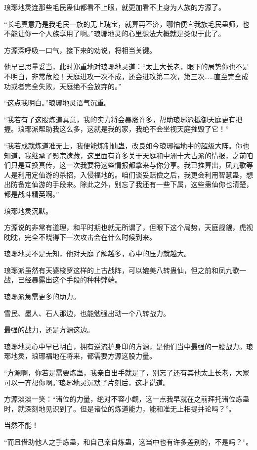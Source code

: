 \begin{this_body}
琅琊地灵连那些毛民蛊仙都看不上眼，就更加看不上身为人族的方源了。

“长毛真意乃是我毛民一族的无上瑰宝，就算再不济，哪怕便宜我族毛民蛊师，也不能让你一个人族享用了啊。”琅琊地灵的心里想法大概就是类似于此了。

方源深呼吸一口气，接下来的劝说，将相当关键。

他早已思量妥当，此时郑重地对琅琊地灵道：“太上大长老，眼下的局势你也不是不明白，非常危险！天庭进攻一次不成，还会进攻第二次，第三次……直至完全成功或者完全失败，天庭绝不会放弃的。”

“这点我明白。”琅琊地灵语气沉重。

“我若有了这股炼道真意，我的实力将会暴涨许多，帮助琅琊派抵御天庭更有把握。琅琊派帮助我这么多，这就是我的家，我绝不会坐视天庭摧毁了它！”

“我若成就炼道准无上，我便能炼制仙蛊，改良如今琅琊福地中的超级大阵。你也知道，我继承了影宗遗藏，这里面有许多关于天庭和中洲十大古派的情报，之前咱们只是互换真传，这一次我要将这些情报都拿来与你分享。我已推算出，凤九歌等人是利用定仙游的杀招，入侵福地的。咱们谈妥赔偿之后，我更会利用智慧蛊，想出防备定仙游的手段来。除此之外，别忘了我还有一些下属，这些蛊仙你也清楚，都是战斗精英啊。”

琅琊地灵沉默。

方源说的非常有道理，和平时期也就无所谓了，但眼下这个局势，天庭觊觎，虎视眈眈，完全不晓得下一次攻击会在什么时候到来。

琅琊地灵不是无知，他对天庭了解越多，心中的压力就越大。

琅琊派虽然有天婆梭罗这样的上古战阵，可以媲美八转蛊仙，但之前和凤九歌一战，已经暴露出这个手段的种种弊端。

琅琊派急需更多的助力。

雪民、墨人、石人那边，也能勉强出动一个八转战力。

最强的战力，还是方源这边。

琅琊地灵心中早已明白，拥有逆流护身印的方源，是他们当中最强的一股战力。琅琊地灵，琅琊福地在将来，都需要方源这股力量。

“方源啊，你若是需要炼蛊，我亲自出手就是了，别忘了还有其他太上长老，大家可以一齐帮你啊。”琅琊地灵沉默了片刻后，这才说道。

方源淡淡一笑：“诸位的力量，绝对不容小觑，这一点我早就在之前拜托诸位炼蛊时，就深刻地见识到了。但是诸位的炼道能力，能和准无上相提并论吗？”。

当然不能！

“而且借助他人之手炼蛊，和自己亲自炼蛊，这当中也有许多差别的，不是吗？”。


\end{this_body}
